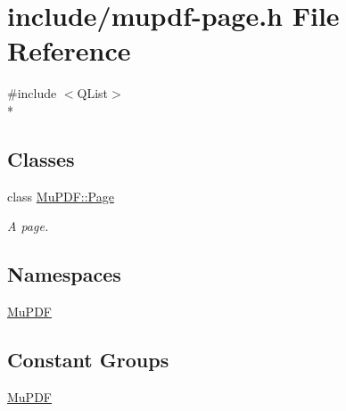 \hypertarget{mupdf-page_8h}{\section{include/mupdf-\/page.h File Reference}
\label{mupdf-page_8h}
}
{\ttfamily \#include $<$Q\-List$>$}\\*
\subsection*{Classes}
\begin{DoxyCompactItemize}
\item 
class \hyperlink{class_mu_p_d_f_1_1_page}{Mu\-P\-D\-F\-::\-Page}
\begin{DoxyCompactList}\small\item\em A page. \end{DoxyCompactList}\end{DoxyCompactItemize}
\subsection*{Namespaces}
\begin{DoxyCompactItemize}
\item 
\hyperlink{namespace_mu_p_d_f}{Mu\-P\-D\-F}
\end{DoxyCompactItemize}
\subsection*{Constant Groups}
\begin{DoxyCompactItemize}
\item 
\hyperlink{namespace_mu_p_d_f}{Mu\-P\-D\-F}
\end{DoxyCompactItemize}
